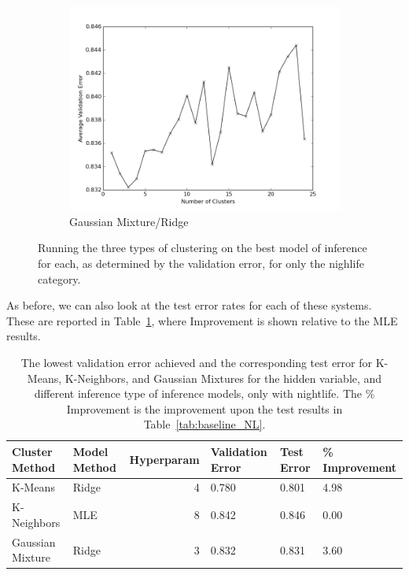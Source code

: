 \documentclass[11pt]{article}
\begin{document}
\begin{figure}[h!]
\begin{subfigure}[h!]{0.33\textwidth}
        \includegraphics[width=\textwidth]{NL_GM_ridge.png}
        \caption{Gaussian Mixture/Ridge}
        \label{fig:gmBEST}
    \end{subfigure}
    \caption{Running the three types of clustering on the best model of inference for each, as determined by the validation error, for only the nighlife category.}
    \label{fig:BEST_NL}
\end{figure}

As before, we can also look at the test error rates for each of these systems. These are reported in Table~\ref{tab:improvement_NL}, where Improvement is shown relative to the MLE results.

\begin{table}[h!]
    \begin{tabularx}{0.9\textwidth}{| l | X | r | X | X | X |}
        \hline
        Cluster Method & Model Method & Hyperparam & Validation Error & Test Error & \% Improvement\\
        \hline
        K-Means & Ridge & 4 & 0.780 & 0.801 & 4.98 \\
        K-Neighbors & MLE & 8 & 0.842 & 0.846 & 0.00 \\
        Gaussian Mixture & Ridge & 3 & 0.832 & 0.831 & 3.60 \\
        \hline
    \end{tabularx}
    \caption{The lowest validation error achieved and the corresponding test error for K-Means, K-Neighbors, and Gaussian Mixtures for the hidden variable, and different inference type of inference models, only with nightlife. The \% Improvement is the improvement upon the test results in Table~\ref{tab:baseline_NL}.}
    \label{tab:improvement_NL}
\end{table}
\end{document}
